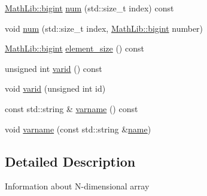 \begin{DoxyCompactItemize}
\item 
\hyperlink{class_math_lib_aea370b3be964c5704b6244d757fcac99}{Math\-Lib\-::bigint} \hyperlink{class_check_buffer_overrun_1_1_array_info_a2929e51008180f6fb841107e2b713bfd}{num} (std\-::size\-\_\-t index) const 
\item 
void \hyperlink{class_check_buffer_overrun_1_1_array_info_a4eb4b2cdac2f6ed389cef5ece64a1076}{num} (std\-::size\-\_\-t index, \hyperlink{class_math_lib_aea370b3be964c5704b6244d757fcac99}{Math\-Lib\-::bigint} number)
\item 
\hyperlink{class_math_lib_aea370b3be964c5704b6244d757fcac99}{Math\-Lib\-::bigint} \hyperlink{class_check_buffer_overrun_1_1_array_info_adf2969f534b0b18edae6924a55cc2bfa}{element\-\_\-size} () const 
\item 
unsigned int \hyperlink{class_check_buffer_overrun_1_1_array_info_af46108a55d6d9249783de6a29f473e53}{varid} () const 
\item 
void \hyperlink{class_check_buffer_overrun_1_1_array_info_aaf1476bba189e2dd999228df7d41b146}{varid} (unsigned int id)
\item 
const std\-::string \& \hyperlink{class_check_buffer_overrun_1_1_array_info_a342b5474c470387495b18ed7ea5116c2}{varname} () const 
\item 
void \hyperlink{class_check_buffer_overrun_1_1_array_info_a1ffa847ee066c635abe3be010d946485}{varname} (const std\-::string \&\hyperlink{class_check_ad9b7ad147b5b4cc9b1a7911162432f1c}{name})
\end{DoxyCompactItemize}


\subsection{Detailed Description}
Information about N-\/dimensional array 


